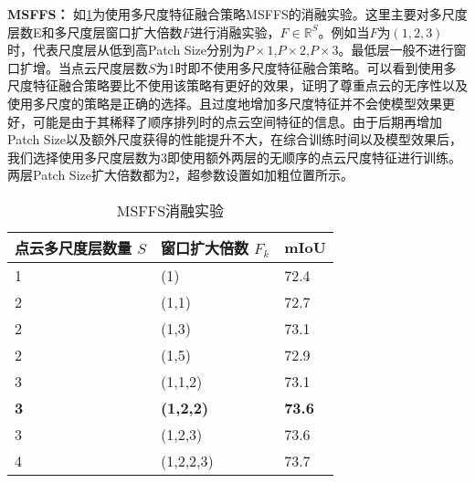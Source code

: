 \documentclass[preprint,12pt]{elsarticle}
\begin{document}
\textbf{MSFFS：}
如\cref{tab:MSFFS}为使用多尺度特征融合策略MSFFS的消融实验。这里主要对多尺度层数E和多尺度层窗口扩大倍数$F$进行消融实验，$F\in \mathbb{R}^{S}$。例如当$F$为$(1,2,3)$时，代表尺度层从低到高Patch Size分别为$P\times 1$,$P\times 2$,$P\times 3$。最低层一般不进行窗口扩增。当点云尺度层数$S$为1时即不使用多尺度特征融合策略。可以看到使用多尺度特征融合策略要比不使用该策略有更好的效果，证明了尊重点云的无序性以及使用多尺度的策略是正确的选择。且过度地增加多尺度特征并不会使模型效果更好，可能是由于其稀释了顺序排列时的点云空间特征的信息。由于后期再增加Patch Size以及额外尺度获得的性能提升不大，在综合训练时间以及模型效果后，我们选择使用多尺度层数为3即使用额外两层的无顺序的点云尺度特征进行训练。两层Patch Size扩大倍数都为2，超参数设置如加粗位置所示。
\begin{table}[htbp!]
	\centering
	\caption{MSFFS消融实验}
	\label{tab:MSFFS}
	\begin{tabular}{@{}lll@{}}
		\toprule
		点云多尺度层数量 $S$ & 窗口扩大倍数 $F_{k}$     & mIoU          \\ \midrule
		1          & (1)              & 72.4          \\
		2          & (1,1)              & 72.7          \\
		2          & (1,3)              & 73.1          \\
		2          & (1,5)              & 72.9          \\
		3          & (1,1,2)          & 73.1          \\
		\textbf{3} & \textbf{(1,2,2)} & \textbf{73.6} \\
		3          & (1,2,3)          & 73.6          \\
		4          & (1,2,2,3)        & 73.7          \\ \bottomrule
	\end{tabular}
\end{table}


\end{document}
